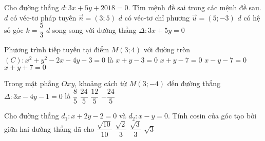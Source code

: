\begin{ex}%
	Cho đường thẳng $d \colon 3x+5y+2018=0$. Tìm mệnh đề sai trong các mệnh đề sau.
	\choice
	{$d$ có véc-tơ pháp tuyến $\overrightarrow{n}=(3;5)$}
	{$d$ có véc-tơ chỉ phương $\overrightarrow{u}=(5;-3)$}
	{$d$ có hệ số góc $k=\dfrac{5}{3}$}
	{\True $d$ song song với đường thẳng $\Delta \colon3x+5y=0$}
\end{ex}
\begin{ex}%
	Phương trình tiếp tuyến tại điểm $M(3;4)$ với đường tròn $(C) \colon x^2+y^2-2x-4y-3=0$ là
	\choice
	{$x+y-3=0$}
	{\True $x+y-7=0$}
	{$x-y-7=0$}
	{$x+y+7=0$}
\end{ex}
\begin{ex}%
	Trong mặt phẳng $Oxy$, khoảng cách từ $M(3;-4)$ đến đường thẳng $\Delta \colon 3x-4y-1=0$ là
	\choice
	{$\dfrac{8}{5}$}
	{\True $\dfrac{24}{5}$}
	{$\dfrac{12}{5}$}
	{$-\dfrac{24}{5}$}
\end{ex}
\begin{ex}%
	Cho đường thẳng $d_{1} \colon x+2y-2=0$ và $d_{2} \colon x-y=0$. Tính cosin của góc tạo bởi giữa hai đường thẳng đã cho
	\choice
	{\True $\dfrac{\sqrt{10}}{10}$}
	{$\dfrac{\sqrt{2}}{3}$}
	{$\dfrac{\sqrt{3}}{3}$}
	{$\sqrt{3}$}
\end{ex}

